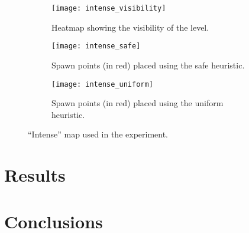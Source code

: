 \begin{figure}[tp]
	\centering  	
  	\begin{subfigure}[t]{0.3\linewidth}
    		\texttt{[image: intense\_visibility]}
     		\caption{Heatmap showing the visibility of the level.}
		\label{img:intense_visibility}
  	\end{subfigure}  	
  	\hfil
  	\begin{subfigure}[t]{0.3\linewidth}
    		\texttt{[image: intense\_safe]}
     		\caption{Spawn points (in red) placed using the safe heuristic.}
     		\label{img:intense_safe}
  	\end{subfigure}
  	\hfil
  	\begin{subfigure}[t]{0.3\linewidth}
    		\texttt{[image: intense\_uniform]}
     		\caption{Spawn points (in red) placed using the uniform heuristic.}
		\label{img:intense_uniform}
  	\end{subfigure}
	\caption{``Intense'' map used in the experiment.}
	
\end{figure}

\section{Results}


\section{Conclusions}

